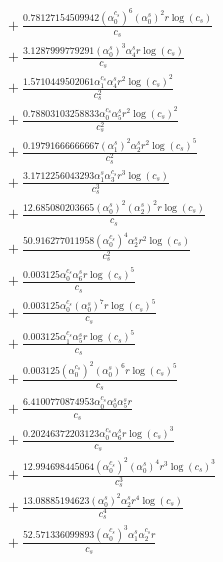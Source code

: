 \documentclass[10pt]{article}
\begin{document}
\begin{align*}
&{}  + \frac{0.78127154509942 \left(\alpha_{0}^{c_s}\right)^{6} \left(\alpha_{0}^s\right)^{2} r \log{\left(c_{s} \right)}}{c_{s}} \\
&{}  + \frac{3.1287999779291 \left(\alpha_{0}^s\right)^{3} \alpha_{4}^s r \log{\left(c_{s} \right)}}{c_{s}} \\
&{}  + \frac{1.5710449502061 \alpha_{1}^{c_s} \alpha_{4}^s r^{2} \log{\left(c_{s} \right)}^{2}}{c_{s}^{2}} \\
&{}  + \frac{0.78803103258833 \alpha_{0}^{c_s} \alpha_{5}^s r^{2} \log{\left(c_{s} \right)}^{2}}{c_{s}^{2}} \\
&{}  + \frac{0.19791666666667 \left(\alpha_{1}^s\right)^{2} \alpha_{2}^s r^{2} \log{\left(c_{s} \right)}^{5}}{c_{s}^{2}} \\
&{}  + \frac{3.1712256043293 \alpha_{1}^s \alpha_{3}^{c_s} r^{3} \log{\left(c_{s} \right)}}{c_{s}^{3}} \\
&{}  + \frac{12.685080203665 \left(\alpha_{0}^s\right)^{2} \left(\alpha_{2}^s\right)^{2} r \log{\left(c_{s} \right)}}{c_{s}} \\
&{}  + \frac{50.916277011958 \left(\alpha_{0}^{c_s}\right)^{4} \alpha_{2}^s r^{2} \log{\left(c_{s} \right)}}{c_{s}^{2}} \\
&{}  + \frac{0.003125 \alpha_{0}^{c_s} \alpha_{6}^s r \log{\left(c_{s} \right)}^{5}}{c_{s}} \\
&{}  + \frac{0.003125 \alpha_{0}^{c_s} \left(\alpha_{0}^s\right)^{7} r \log{\left(c_{s} \right)}^{5}}{c_{s}} \\
&{}  + \frac{0.003125 \alpha_{1}^{c_s} \alpha_{5}^s r \log{\left(c_{s} \right)}^{5}}{c_{s}} \\
&{}  + \frac{0.003125 \left(\alpha_{0}^{c_s}\right)^{2} \left(\alpha_{0}^s\right)^{6} r \log{\left(c_{s} \right)}^{5}}{c_{s}} \\
&{}  + \frac{6.4100770874953 \alpha_{0}^{c_s} \alpha_{0}^s \alpha_{5}^s r}{c_{s}} \\
&{}  + \frac{0.20246372203123 \alpha_{0}^{c_s} \alpha_{6}^s r \log{\left(c_{s} \right)}^{3}}{c_{s}} \\
&{}  + \frac{12.994698445064 \left(\alpha_{0}^{c_s}\right)^{2} \left(\alpha_{0}^s\right)^{4} r^{3} \log{\left(c_{s} \right)}^{3}}{c_{s}^{3}} \\
&{}  + \frac{13.08885194623 \left(\alpha_{0}^s\right)^{2} \alpha_{2}^s r^{4} \log{\left(c_{s} \right)}}{c_{s}^{4}} \\
&{}  + \frac{52.571336099893 \left(\alpha_{0}^{c_s}\right)^{3} \alpha_{1}^s \alpha_{2}^{c_s} r}{c_{s}} \\

\end{align*}
\end{document}
